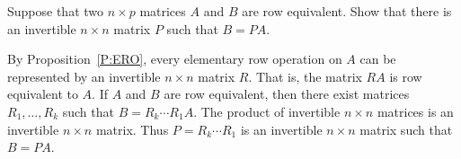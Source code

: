 \documentclass{ximera}
\begin{document}
\begin{exercise}  \label{c10.1.c8} 
Suppose that two $n\times p$ matrices $A$ and $B$ are row
equivalent.  Show that there is an invertible
$n\times n$ matrix $P$ such that $B = PA$.

\begin{solution}
\soln
By Proposition~\ref{P:ERO}, every
elementary row operation on $A$ can be represented by an invertible $n
\times n$ matrix $R$.  That is, the matrix $RA$ is row equivalent to
$A$.  If $A$ and $B$ are row equivalent, then there exist matrices
$R_1,\ldots,R_k$ such that $B = R_k\cdots R_1A$.  The product of invertible $n
\times n$ matrices is an invertible $n \times n$ matrix.  Thus $P =
R_k\cdots R_1$ is an invertible $n \times n$ matrix such that $B =
PA$.

\end{solution}
\end{exercise}
\end{document}
